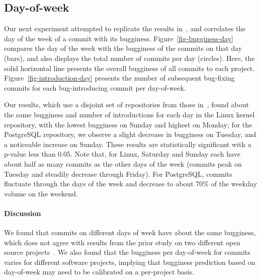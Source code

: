 \subsection{Day-of-week}
\label{sec-day-of-week}

Our next experiment attempted to replicate the results
in~\cite{sliwerski-msr-2005}, and correlates the day of the week of a commit with
its bugginess. Figure~\ref{fig-bugginess-day} compares the day of the week with
the bugginess of the commits on that day (bars), and also displays the total
number of commits per day (circles). Here, the solid horizontal line presents
the overall bugginess of all commits to each project.
Figure~\ref{fig-introduction-day} presents the number of subsequent bug-fixing
commits for each bug-introducing commit per day-of-week.%

Our results, which use a disjoint set of repositories from those
in~\cite{sliwerski-msr-2005}, found about the same bugginess and number of
introductions for each day in the Linux kernel repository, with the lowest
bugginess on Sunday and highest on Monday; for the PostgreSQL repository, we
observe a slight decrease in bugginess on Tuesday, and a noticeable increase on
Sunday. These results are statistically significant with a p-value less than
0.05. Note that, for Linux, Saturday and Sunday each have about half as many
commits as the other days of the week (commits peak on Tuesday and steadily
decrease through Friday). For PostgreSQL, commits fluctuate through the days of
the week and decrease to about 70\% of the weekday volume on the weekend. %

\paragraph{Discussion}

We found that commits on different days of week have about the same
bugginess, which does not agree with results from the prior study on two
different open source projects~\cite{sliwerski-msr-2005}. 
We also found that the bugginess per
day-of-week for commits varies for different software projects, implying that
bugginess prediction based on day-of-week may need to be calibrated on a 
per-project basis.

